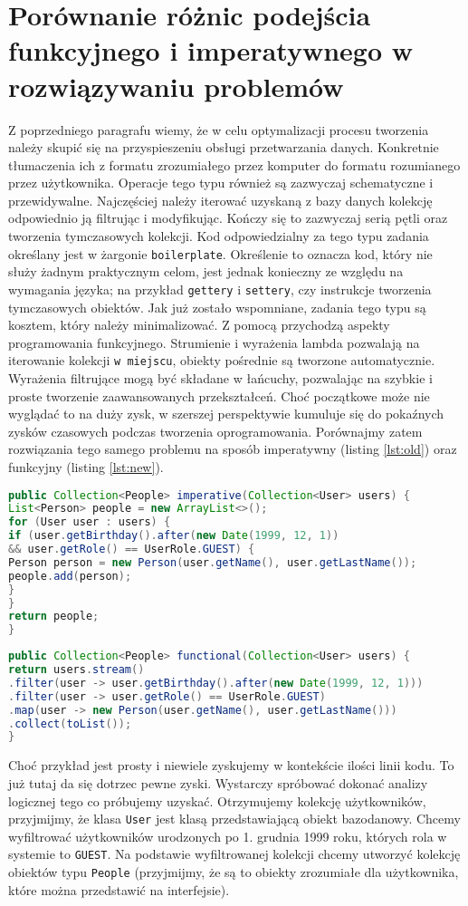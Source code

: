 \documentclass[a4paper,10pt]{report}
\begin{document}
\section{Porównanie różnic podejścia funkcyjnego i imperatywnego w rozwiązywaniu problemów}
Z poprzedniego paragrafu wiemy, że w celu optymalizacji procesu tworzenia należy skupić się na przyspieszeniu obsługi przetwarzania danych. Konkretnie tłumaczenia ich z formatu zrozumiałego przez komputer do formatu rozumianego przez użytkownika. Operacje tego typu również są zazwyczaj schematyczne i przewidywalne. Najczęściej należy iterować uzyskaną z bazy danych kolekcję odpowiednio ją filtrując i modyfikując. Kończy się to zazwyczaj serią pętli oraz tworzenia tymczasowych kolekcji. Kod odpowiedzialny za tego typu zadania określany jest w żargonie \verb|boilerplate|. Określenie to oznacza kod, który nie służy żadnym praktycznym celom, jest jednak konieczny ze względu na wymagania języka; na przykład \verb|gettery| i \verb|settery|, czy instrukcje tworzenia tymczasowych obiektów. Jak już zostało wspomniane, zadania tego typu są kosztem, który należy minimalizować. Z pomocą przychodzą aspekty programowania funkcyjnego. Strumienie i wyrażenia lambda pozwalają na iterowanie kolekcji \verb|w miejscu|, obiekty pośrednie są tworzone automatycznie. Wyrażenia filtrujące mogą być składane w łańcuchy, pozwalając na szybkie i proste tworzenie zaawansowanych przekształceń. Choć początkowe może nie wyglądać to na duży zysk, w szerszej perspektywie kumuluje się do pokaźnych zysków czasowych podczas tworzenia oprogramowania. Porównajmy zatem rozwiązania tego samego problemu na sposób imperatywny (listing \ref{lst:old}) oraz funkcyjny (listing \ref{lst:new}).
\begin{lstlisting}[caption={Podejście imperatywne},label={lst:old},language=Java]
public Collection<People> imperative(Collection<User> users) {
List<Person> people = new ArrayList<>();
for (User user : users) {
if (user.getBirthday().after(new Date(1999, 12, 1))
&& user.getRole() == UserRole.GUEST) {
Person person = new Person(user.getName(), user.getLastName());
people.add(person);
}
}
return people;
}
\end{lstlisting}
\begin{lstlisting}[caption={Podejście funkcyjne},label={lst:new},language=Java]
public Collection<People> functional(Collection<User> users) {
return users.stream()
.filter(user -> user.getBirthday().after(new Date(1999, 12, 1)))
.filter(user -> user.getRole() == UserRole.GUEST)
.map(user -> new Person(user.getName(), user.getLastName()))
.collect(toList());
}
\end{lstlisting}
Choć przykład jest prosty i niewiele zyskujemy w kontekście ilości linii kodu. To już tutaj da się dotrzec pewne zyski. Wystarczy spróbować dokonać analizy logicznej tego co próbujemy uzyskać. Otrzymujemy kolekcję użytkowników, przyjmijmy, że klasa \verb|User| jest klasą przedstawiającą obiekt bazodanowy. Chcemy wyfiltrować użytkowników urodzonych po 1. grudnia 1999 roku, których rola w systemie to \verb|GUEST|. Na podstawie wyfiltrowanej kolekcji chcemy utworzyć kolekcję obiektów typu \verb|People| (przyjmijmy, że są to obiekty zrozumiałe dla użytkownika, które można przedstawić na interfejsie).
\end{document}
